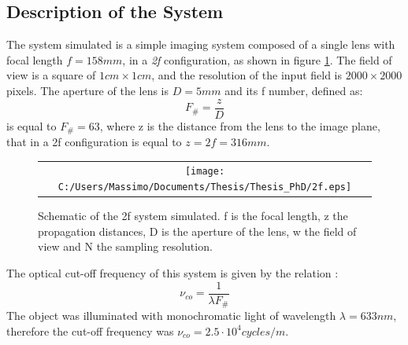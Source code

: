 	 \subsection{Description of the System}
	 \label{sec:system}
	 The system simulated is a simple imaging system composed of a single lens with focal length $f=158mm$, in a \textit{2f} configuration, as shown in figure \ref{fig:2f}. The field of view is a square of $1cm \times 1cm$, and the resolution of the input field is $2000 \times 2000$ pixels. The aperture of the lens is $D=5mm$ and its f number, defined as:
	 \begin{equation}
	 \label{eq:fnum}
		F_{\#}=\dfrac{z}{D}
	 \end{equation}
	 is equal to $F_{\#}=63$, where z is the distance from the lens to the image plane, that in a 2f configuration is equal to $z=2f=316mm$.
	 \begin{figure}[h]
	 	\begin{center}
	 		\begin{tabular}{c}
	 			\texttt{[image: C:/Users/Massimo/Documents/Thesis/Thesis\_PhD/2f.eps]}
	 		\end{tabular}
	 	\end{center}
	 	\caption{ \label{fig:2f} 
	 		Schematic of the 2f system simulated. f is the focal length, z the propagation distances, D is the aperture of the lens, w the field of view and N the sampling resolution. }
	 \end{figure} 
	 The optical cut-off frequency of this system is given by the relation \cite{goodman2005introduction}:
	 \begin{equation}
	 \label{eq:cutoff}
	 \nu_{co}=\dfrac{1}{\lambda F_{\#}}
	 \end{equation} 
	 The object was illuminated with monochromatic light of wavelength $\lambda=633nm$, therefore the cut-off frequency was $\nu_{co}=2.5\cdot10^4 cycles/m$.
